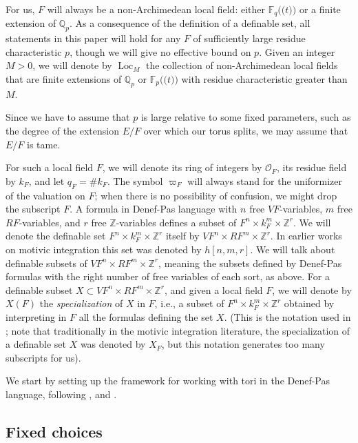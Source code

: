 \documentclass{amsart}
\newcommand{\Q}{{\mathbb Q}}
\newcommand{\F}{{\mathbb F}}
\newcommand{\Z}{{\mathbb Z}}
\newcommand{\ri}{\mathcal{O}}
\newcommand{\loc}{\operatorname{Loc}}
\def\llp{\mathopen{(\!(}}
\def\rrp{\mathopen{)\!)}}
\theoremstyle{plain}
\theoremstyle{definition}
\begin{document}
For us, $F$ will always be a non-Archimedean local field: either $\F_q\llp t\rrp$ or a finite extension of $\Q_p$.
As a consequence of the definition of a definable set, all statements in this paper will hold for any $F$ of sufficiently large residue characteristic $p$, 
though we will give no effective bound on $p$. 
Given an integer $M>0$, we will denote by $\loc_M$ the collection of non-Archimedean local fields that are finite extensions of $\Q_p$ or $\F_p\llp t\rrp$ with residue characteristic greater than $M$. 

Since we have to assume that $p$ is large relative to some fixed parameters, such as the degree of the extension $E/F$ over which our torus splits, we may assume that $E/F$ is tame.  

For such a local field $F$, we will denote its ring of integers by $\ri_F$, its residue field by $k_F$, and let $q_F=\# k_F$. The symbol $\varpi_F$ will always stand for the uniformizer of the valuation on $F$; when there is no possibility of confusion, we might drop the subscript $F$. 
A formula in Denef-Pas language  with $n$ free $VF$-variables, $m$ free $RF$-variables, and $r$ free 
$\Z$-variables 
defines a subset of $F^n\times k_F^m \times \Z^r$. 
We will denote the definable set $F^n\times k_F^m \times \Z^r$ itself by $VF^n\times RF^m\times \Z^r$. In earlier works on motivic integration this set was denoted by $h[n,m,r]$. 
We will talk about definable subsets of $VF^n\times RF^m\times \Z^r$, meaning the subsets defined by Denef-Pas formulas with the right number of free variables of each sort, as above. 
For  a definable subset $X\subset VF^n\times RF^m\times \Z^r$, and given a local field $F$,  
we will denote by $X(F)$ the \emph{specialization} of $X$ in $F$, i.e., a subset of $F^n\times k_F^m\times \Z^r$ obtained by interpreting in $F$ all the formulas defining the set $X$. 
(This is the notation used in \cite{hales:transfert}; note that traditionally in the motivic integration literature, the {specialization} of a definable set $X$ was denoted by $X_F$, but this notation generates too many subscripts for us). 

We start by setting up the framework for working with tori in the Denef-Pas language, following \cite{cluckers-hales-loeser}, \cite{CGH-2} and \cite{hales:transfert}.



\subsection{Fixed choices}\label{sub:fixedchoices}
\end{document}
